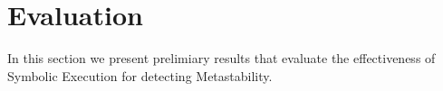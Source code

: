 \section{Evaluation}
\label{sec:eval}

In this section we present prelimiary results that evaluate
the effectiveness of Symbolic Execution for detecting Metastability.

